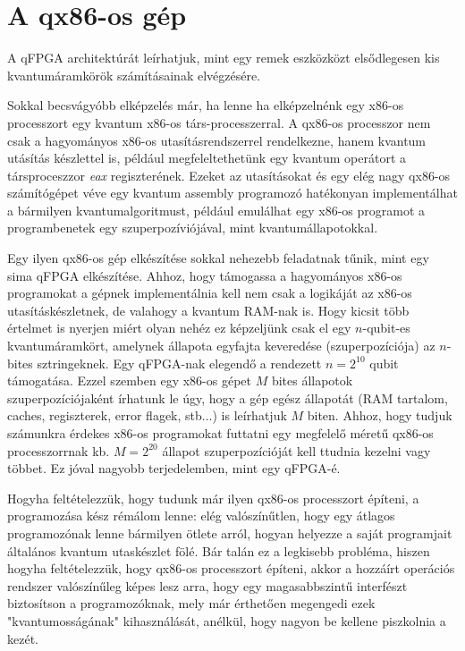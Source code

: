 \chapter{A qx86-os gép}\label{sect:qx86}
\hspace{2mm} A qFPGA architektúrát leírhatjuk, mint egy remek eszközközt elsődlegesen kis kvantumáramkörök számításainak elvégzésére.

\indent Sokkal becsvágyóbb elképzelés már, ha lenne ha elképzelnénk egy x86-os processzort egy kvantum x86-os társ-processzerral.
A qx86-os processzor nem csak a hagyományos x86-os utasításrendszerrel rendelkezne, hanem kvantum utásítás készlettel is, például megfeleltethetünk egy kvantum operátort a társproceszzor \textit{eax} regiszterének.
Ezeket az utasításokat és egy elég nagy qx86-os számítógépet véve egy kvantum assembly programozó hatékonyan implementálhat a bármilyen kvantumalgoritmust, például emulálhat egy x86-os programot a programbenetek egy szuperpozíviójával, mint kvantumállapotokkal.

\indent Egy ilyen qx86-os gép elkészítése sokkal nehezebb feladatnak tűnik, mint egy sima qFPGA elkészítése.
Ahhoz, hogy támogassa a hagyományos x86-os programokat a gépnek implementálnia kell nem csak a logikáját az x86-os utasításkészletnek, de valahogy a kvantum RAM-nak is.
Hogy kicsit több értelmet is nyerjen miért olyan nehéz ez képzeljünk csak el egy $n$-qubit-es kvantumáramkört, amelynek állapota egyfajta keveredése (szuperpozíciója) az $n$-bites sztringeknek.
Egy qFPGA-nak elegendő a rendezett $n=2^{10}$  qubit támogatása.
\indent Ezzel szemben egy x86-os gépet $M$ bites állapotok szuperpozíciójaként írhatunk le úgy, hogy a gép egész állapotát (RAM tartalom, caches, regiszterek, error flagek, stb...) is leírhatjuk $M$ biten.
Ahhoz, hogy tudjuk számunkra érdekes x86-os programokat futtatni egy megfelelő méretű qx86-os processzorrnak kb. $M = 2^{20}$ állapot szuperpozícióját kell ttudnia kezelni vagy többet.
Ez jóval nagyobb terjedelemben, mint egy qFPGA-é.

\indent Hogyha feltételezzük, hogy tudunk már ilyen qx86-os processzort építeni, a programozása kész rémálom lenne: elég valószínűtlen, hogy egy átlagos programozónak lenne bármilyen ötlete arról, hogyan helyezze a saját programjait általános kvantum utaskészlet fölé.
Bár talán ez a legkisebb probléma, hiszen hogyha feltételezzük, hogy qx86-os processzort építeni, akkor a hozzáírt operációs rendszer valószínűleg képes lesz arra, hogy egy magasabbszintű interfészt biztosítson a programozóknak, mely már érthetően megengedi ezek "kvantumosságának" kihasználását, anélkül, hogy nagyon be kellene piszkolnia a kezét.

